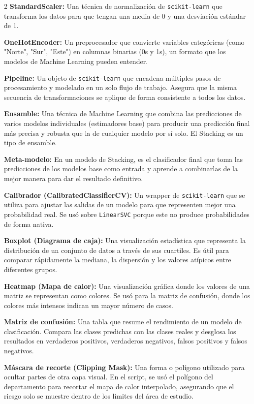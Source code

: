 \documentclass[a4paper,10pt]{article}
\begin{document}
\begin{multicols}{2}
\textbf{StandardScaler:} Una técnica de normalización de \texttt{scikit-learn} que transforma los datos para que tengan una media de 0 y una desviación estándar de 1.

\textbf{OneHotEncoder:} Un preprocesador que convierte variables categóricas (como "Norte", "Sur", "Este") en columnas binarias (0s y 1s), un formato que los modelos de Machine Learning pueden entender.

\textbf{Pipeline:} Un objeto de \texttt{scikit-learn} que encadena múltiples pasos de procesamiento y modelado en un solo flujo de trabajo. Asegura que la misma secuencia de transformaciones se aplique de forma consistente a todos los datos.

\textbf{Ensamble:} Una técnica de Machine Learning que combina las predicciones de varios modelos individuales (estimadores base) para producir una predicción final más precisa y robusta que la de cualquier modelo por sí solo. El Stacking es un tipo de ensamble.

\textbf{Meta-modelo:} En un modelo de Stacking, es el clasificador final que toma las predicciones de los modelos base como entrada y aprende a combinarlas de la mejor manera para dar el resultado definitivo.

\textbf{Calibrador (CalibratedClassifierCV):} Un wrapper de \texttt{scikit-learn} que se utiliza para ajustar las salidas de un modelo para que representen mejor una probabilidad real. Se usó sobre \texttt{LinearSVC} porque este no produce probabilidades de forma nativa.

\textbf{Boxplot (Diagrama de caja):} Una visualización estadística que representa la distribución de un conjunto de datos a través de sus cuartiles. Es útil para comparar rápidamente la mediana, la dispersión y los valores atípicos entre diferentes grupos.

\textbf{Heatmap (Mapa de calor):} Una visualización gráfica donde los valores de una matriz se representan como colores. Se usó para la matriz de confusión, donde los colores más intensos indican un mayor número de casos.

\textbf{Matriz de confusión:} Una tabla que resume el rendimiento de un modelo de clasificación. Compara las clases predichas con las clases reales y desglosa los resultados en verdaderos positivos, verdaderos negativos, falsos positivos y falsos negativos.

\textbf{Máscara de recorte (Clipping Mask):} Una forma o polígono utilizado para ocultar partes de otra capa visual. En el script, se usó el polígono del departamento para recortar el mapa de calor interpolado, asegurando que el riesgo solo se muestre dentro de los límites del área de estudio.


\end{multicols}
\end{document}
